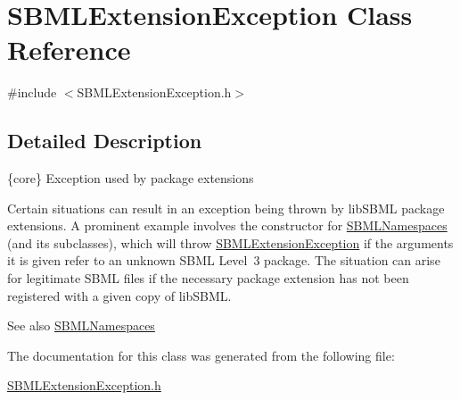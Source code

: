 \hypertarget{class_s_b_m_l_extension_exception}{}\section{S\+B\+M\+L\+Extension\+Exception Class Reference}
\label{class_s_b_m_l_extension_exception}


{\ttfamily \#include $<$S\+B\+M\+L\+Extension\+Exception.\+h$>$}



\subsection{Detailed Description}
\{core\} Exception used by package extensions



\begin{DoxyParagraph}{}
Certain situations can result in an exception being thrown by lib\+S\+B\+ML package extensions. A prominent example involves the constructor for \hyperlink{class_s_b_m_l_namespaces}{S\+B\+M\+L\+Namespaces} (and its subclasses), which will throw \hyperlink{class_s_b_m_l_extension_exception}{S\+B\+M\+L\+Extension\+Exception} if the arguments it is given refer to an unknown S\+B\+ML Level~3 package. The situation can arise for legitimate S\+B\+ML files if the necessary package extension has not been registered with a given copy of lib\+S\+B\+ML.
\end{DoxyParagraph}
\begin{DoxySeeAlso}{See also}
\hyperlink{class_s_b_m_l_namespaces}{S\+B\+M\+L\+Namespaces} 
\end{DoxySeeAlso}


The documentation for this class was generated from the following file\+:\begin{DoxyCompactItemize}
\item 
\hyperlink{_s_b_m_l_extension_exception_8h}{S\+B\+M\+L\+Extension\+Exception.\+h}\end{DoxyCompactItemize}
